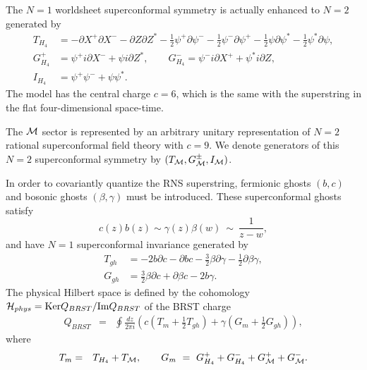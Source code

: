 \documentclass[a4paper,seceq,preprint]{ptptex}
\newcommand{\dz}{\frac{dz}{2\pi i}}
\begin{document}
The $N=1$ worldsheet superconformal symmetry is actually
enhanced to $N=2$ generated by
\begin{align}
 T_{H_4}&=-\partial X^+\partial X^--\partial Z\partial Z^*
 -\frac{1}{2}\psi^+\partial \psi^-
 -\frac{1}{2}\psi^-\partial\psi^+
 -\frac{1}{2}\psi\partial\psi^*
 -\frac{1}{2}\psi^*\partial\psi,\nonumber\\
 G^+_{H_4}&=\psi^+i\partial X^-+\psi i\partial Z^*,\qquad
G^-_{H_4}=\psi^-i\partial X^++\psi^*i\partial Z,\nonumber\\
 I_{H_4}&=\psi^+\psi^-+\psi\psi^*.
\end{align}
The model has the central charge $c=6$, which is the same with 
the superstring in the flat four-dimensional space-time.

The ${\cal M}$ sector is represented by 
an arbitrary unitary representation of $N=2$ rational 
superconformal field theory with $c=9$. We denote generators of 
this $N=2$ superconformal symmetry by 
$(T_{\cal M},G^\pm_{\cal M},I_{\cal M})$. 

In order to covariantly quantize the RNS superstring,
fermionic ghosts $(b,c)$ and bosonic ghosts $(\beta,\gamma)$
must be introduced. These superconformal ghosts satisfy 
\begin{equation}
 c(z)b(z)\sim\gamma(z)\beta(w)\ \sim\ \frac{1}{z-w},
\end{equation}
and have $N=1$ superconformal invariance generated by
\begin{align}
 T_{gh}&=-2b\partial c-\partial bc
-\frac{3}{2}\beta\partial\gamma-\frac{1}{2}\partial\beta\gamma,
\nonumber\\
 G_{gh}&=\frac{3}{2}\beta\partial c+\partial\beta c-2b\gamma.
\end{align}
The physical Hilbert space is defined by the cohomology 
${\cal H}_{phys}={\rm Ker}Q_{BRST}/{\rm Im}Q_{BRST}$
of the BRST charge
\begin{eqnarray}
 Q_{BRST}&=&\oint\dz\left(c\left(T_m+\frac{1}{2}T_{gh}\right)
+\gamma\left(G_m+\frac{1}{2}G_{gh}\right)\right),
\end{eqnarray}
where
\begin{eqnarray}
 T_m&=&T_{H_4}+T_{\cal M},\qquad 
G_m\ =\ G^+_{H_4}+G^-_{H_4}+G^+_{\cal M}+G^-_{\cal M}.
\end{eqnarray}
\end{document}
